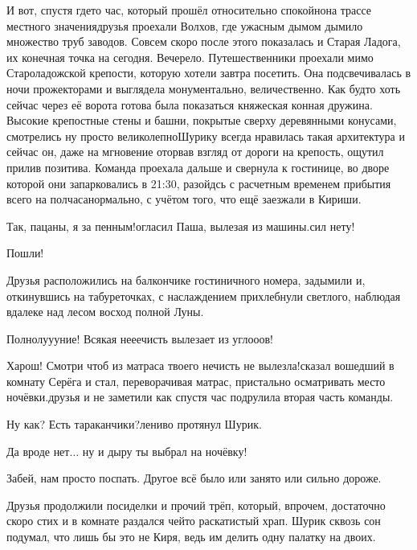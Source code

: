 И вот, спустя где\sdash то час, который прошёл относительно спокойно\mdash на трассе местного значения\mdash друзья проехали Волхов, где ужасным дымом дымило множество труб заводов. Совсем скоро после этого показалась и Старая Ладога, их конечная точка на сегодня. Вечерело. Путешественники проехали мимо Староладожской крепости, которую хотели завтра посетить. Она подсвечивалась в ночи прожекторами и выглядела монументально, величественно. Как будто хоть сейчас через её ворота готова была показаться княжеская конная дружина. Высокие крепостные стены и башни, покрытые сверху деревянными конусами, смотрелись ну просто великолепно\mdash Шурику всегда нравилась такая архитектура и сейчас он, даже на мгновение оторвав взгляд от дороги на крепость, ощутил прилив позитива. Команда проехала дальше и свернула к гостинице, во дворе которой они запарковались в 21:30, разойдсь с расчетным временем прибытия всего на полчаса\mdash нормально, с учётом того, что ещё заезжали в Кириши.

\diagdash Так, пацаны, я за пенным!\mdash огласил Паша, вылезая из машины.\mdash сил нету!

\diagdash Пошли!

Друзья расположились на балкончике гостиничного номера, задымили и, откинувшись на табуреточках, с наслаждением прихлебнули светлого, наблюдая вдалеке над лесом восход полной Луны.

\diagdash Полнолу\sdash у\sdash уние! Всякая не\sdash е\sdash ечисть вылезает из угло\sdash о\sdash ов!

\diagdash Харош! Смотри чтоб из матраса твоего нечисть не вылезла!\mdash сказал вошедший в комнату Серёга и стал, переворачивая матрас, пристально осматривать место ночёвки.\mdash друзья и не заметили как спустя час подрулила вторая часть команды.

\diagdash Ну как? Есть тараканчики?\mdash лениво протянул Шурик.

\diagdash Да вроде нет$\ldots$ ну и дыру ты выбрал на ночёвку! 

\diagdash Забей, нам просто поспать. Другое всё было или занято или сильно дороже.

Друзья продолжили посиделки и прочий трёп, который, впрочем, достаточно скоро стих и в комнате раздался чей\sdash то раскатистый храп. Шурик сквозь сон подумал, что лишь бы это не Киря, ведь им делить одну палатку на двоих.

\begin{center}
\end{center}